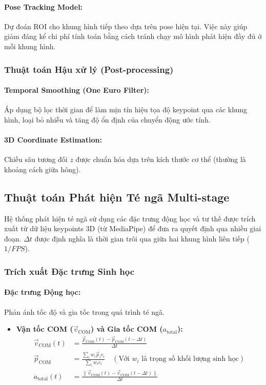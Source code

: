 \paragraph{Pose Tracking Model:} Dự đoán ROI cho khung hình tiếp theo dựa trên pose hiện tại. Việc này giúp giảm đáng kể chi phí tính toán bằng cách tránh chạy mô hình phát hiện đầy đủ ở mỗi khung hình.

\subsubsection{Thuật toán Hậu xử lý (Post-processing)}

\paragraph{Temporal Smoothing (One Euro Filter):} Áp dụng bộ lọc thời gian để làm mịn tín hiệu tọa độ keypoint qua các khung hình, loại bỏ nhiễu và tăng độ ổn định của chuyển động ước tính.

\paragraph{3D Coordinate Estimation:} Chiều sâu tương đối $z$ được chuẩn hóa dựa trên kích thước cơ thể (thường là khoảng cách giữa hông).

\subsection{Thuật toán Phát hiện Té ngã Multi-stage}

Hệ thống phát hiện té ngã sử dụng các đặc trưng động học và tư thế được trích xuất từ dữ liệu keypoints 3D (từ MediaPipe) để đưa ra quyết định qua nhiều giai đoạn. $\Delta t$ được định nghĩa là thời gian trôi qua giữa hai khung hình liên tiếp ($1/FPS$).

\subsubsection{Trích xuất Đặc trưng Sinh học}

\paragraph{Đặc trưng Động học:} Phản ánh tốc độ và gia tốc trong quá trình té ngã.
\begin{itemize}
    \item \textbf{Vận tốc COM ($\vec{v}_{\text{COM}}$) và Gia tốc COM ($a_{\text{total}}$):}
    \begin{align}
    \vec{v}_{\text{COM}}(t) &= \frac{\vec{p}_{\text{COM}}(t) - \vec{p}_{\text{COM}}(t-\Delta t)}{\Delta t} \\
    \vec{p}_{\text{COM}} &= \frac{\sum_i w_i \vec{p}_i c_i}{\sum_i w_i c_i} \quad (\text{Với } w_i \text{ là trọng số khối lượng sinh học}) \\
    a_{\text{total}}(t) &= \frac{\|\vec{v}_{\text{COM}}(t) - \vec{v}_{\text{COM}}(t-\Delta t)\|}{\Delta t}
    \end{align}
\end{itemize}

